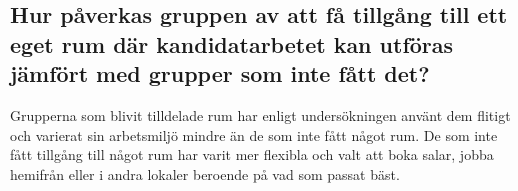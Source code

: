\subsection{Hur påverkas gruppen av att få tillgång till ett eget rum där kandidatarbetet kan utföras jämfört med grupper som inte fått det?}
Grupperna som blivit tilldelade rum har enligt undersökningen använt dem flitigt och varierat sin arbetsmiljö mindre än de som inte fått något rum. De som inte fått tillgång till något rum har varit mer flexibla och valt att boka salar, jobba hemifrån eller i andra lokaler beroende på vad som passat bäst. 


